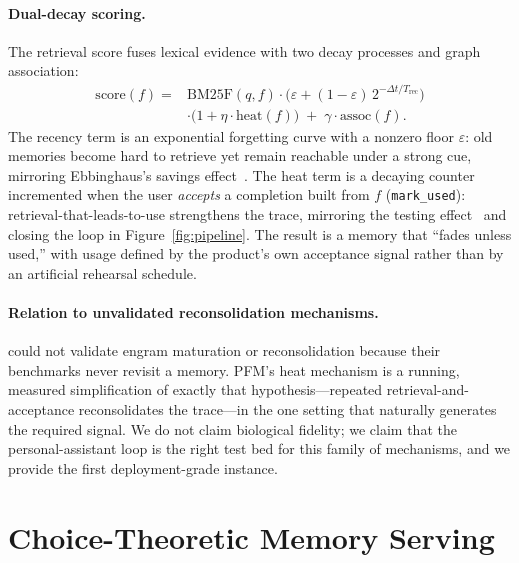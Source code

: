 \documentclass[letterpaper]{article}
\begin{document}
\paragraph{Dual-decay scoring.}
The retrieval score fuses lexical evidence with two decay processes and
graph association:
\begin{equation}
\label{eq:score}
\begin{split}
\mathrm{score}(f) ={}& \mathrm{BM25F}(q,f) \cdot
  \Big(\varepsilon + (1-\varepsilon)\, 2^{-\Delta t / T_{\mathrm{rec}}}\Big)\\
&\cdot \big(1 + \eta \cdot \mathrm{heat}(f)\big)
  \;+\; \gamma \cdot \mathrm{assoc}(f).
\end{split}
\end{equation}
The recency term is an exponential forgetting curve with a nonzero floor
$\varepsilon$: old memories become hard to retrieve yet remain reachable
under a strong cue, mirroring Ebbinghaus's savings
effect~\citep{ebbinghaus1885memory}. The heat term is a decaying counter
incremented when the user \emph{accepts} a completion built from $f$
(\texttt{mark\_used}): retrieval-that-leads-to-use strengthens the trace,
mirroring the testing effect~\citep{roediger2006test} and closing the
loop in Figure~\ref{fig:pipeline}. The result is a memory that ``fades
unless used,'' with usage defined by the product's own acceptance signal
rather than by an artificial rehearsal schedule.

\paragraph{Relation to unvalidated reconsolidation mechanisms.}
\citet{kerestecioglu2026human} could not validate engram maturation or
reconsolidation because their benchmarks never revisit a memory. PFM's
heat mechanism is a running, measured simplification of exactly that
hypothesis---repeated retrieval-and-acceptance reconsolidates the
trace---in the one setting that naturally generates the required signal.
We do not claim biological fidelity; we claim that the personal-assistant
loop is the right test bed for this family of mechanisms, and we provide
the first deployment-grade instance.

\section{Choice-Theoretic Memory Serving}
\end{document}
